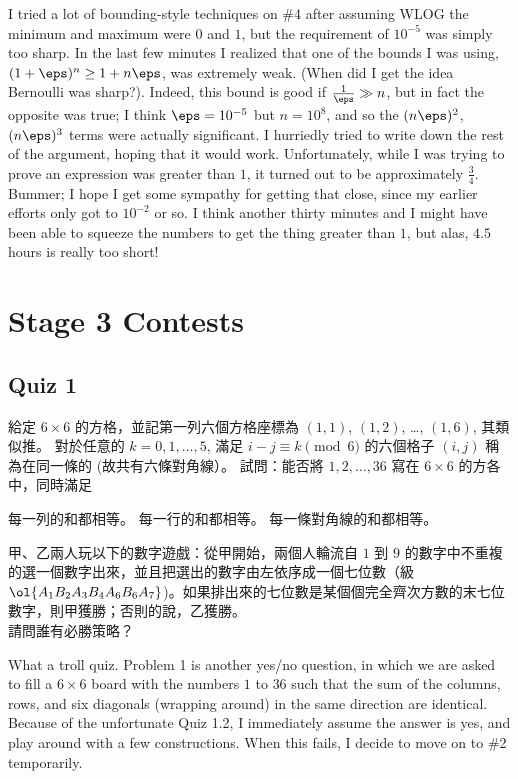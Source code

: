 \documentclass[11pt]{scrreprt}
\begin{document}
I tried a lot of bounding-style techniques on \#4 after assuming WLOG the minimum and maximum were $0$ and $1$, but the requirement of $10^{-5}$ was simply too sharp. In the last few minutes I realized that one of the bounds I was using, $(1+\eps)^n \ge 1+n\eps$, was extremely weak. (When did I get the idea Bernoulli was sharp?). Indeed, this bound is good if $\frac{1}{\eps} \gg n$, but in fact the opposite was true; I think $\eps = 10^{-5}$ but $n = 10^{8}$, and so the $(n\eps)^2$, $(n\eps)^3$ terms were actually significant. I hurriedly tried to write down the rest of the argument, hoping that it would work.
Unfortunately, while I was trying to prove an expression was greater than $1$, it turned out to be approximately $\frac 34$. Bummer; I hope I get some sympathy for getting that close, since my earlier efforts only got to $10^{-2}$ or so. I think another thirty minutes and I might have been able to squeeze the numbers to get the thing greater than $1$, but alas, $4.5$ hours is really too short!



\section{Stage 3 Contests}
\subsection{Quiz 1}
\begin{enumerate}
  \ii 給定 $6 \times 6$ 的方格，並記第一列六個方格座標為 $(1,1)$, $(1,2)$, \dots, $(1,6)$, 其類似推。
  對於任意的 $k=0,1,\dots,5$, 滿足 $i-j \equiv k \pmod 6$ 的六個格子 $(i,j)$ 稱為在同一條的 (故共有六條對角線）。
  試問：能否將 $1,2,\dots,36$ 寫在 $6 \times 6$ 的方各中，同時滿足
  \begin{enumerate}[(1)]
    \ii 每一列的和都相等。
    \ii 每一行的和都相等。
    \ii 每一條對角線的和都相等。
  \end{enumerate}
  \ii 甲、乙兩人玩以下的數字遊戲：從甲開始，兩個人輪流自 $1$ 到 $9$ 的數字中不重複的選一個數字出來，並且把選出的數字由左依序成一個七位數（級 $\ol{A_1B_2A_3B_4A_6B_6A_7}$)。如果排出來的七位數是某個個完全齊次方數的末七位數字，則甲獲勝；否則的說，乙獲勝。 \\
  請問誰有必勝策略？
\end{enumerate}
What a troll quiz. Problem 1 is another yes/no question, in which we are asked to fill a $6 \times 6$ board with the numbers $1$ to $36$ such that the sum of the columns, rows, and six diagonals (wrapping around) in the same direction are identical. Because of the unfortunate Quiz 1.2, I immediately assume the answer is yes, and play around with a few constructions. When this fails, I decide to move on to \#2 temporarily.
\end{document}
